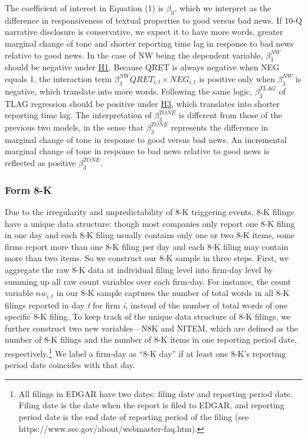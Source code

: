 \documentclass[letterpaper,12pt]{article}
\begin{document}
\begin{spacing}{1.5}
The coefficient of interest in Equation (1) is $\beta_3$, which we interpret as the difference in responsiveness of textual properties to good versus bad news. If 10-Q narrative disclosure is conservative, we expect it to have more words, greater marginal change of tone and shorter reporting time lag in response to bad news relative to good news. In the case of NW being the dependent variable, $\beta_3^{NW}$ should be negative under \hyperref[h1]{H1}. Because QRET is always negative when NEG equals 1, the interaction term $\beta_3^{NW}QRET_{i,t}\times NEG_{i,t}$ is positive only when $\beta_3^{NW}$ is negative, which translate into more words. Following the same logic, $\beta_3^{TLAG}$ of TLAG regression should be positive under \hyperref[h3]{H3}, which translates into shorter reporting time lag. The interpretation of $\beta_3^{TONE}$ is different from those of the previous two models, in the sense that $\beta_3^{TONE}$ represents the difference in marginal change of tone in response to good versus bad news. An incremental marginal change of tone in response to bad news relative to good news is reflected as positive $\beta_3^{TONE}$.

\subsubsection{Form 8-K} \label{sec3.3.2}
\noindent Due to the irregularity and unpredictability of 8-K triggering events, 8-K filings have a unique data structure: though most companies only report one 8-K filing in one day and each 8-K filing usually contains only one or two 8-K items, some firms report more than one 8-K filing per day and each 8-K filing may contain more than two items. So we construct our 8-K sample in three steps. First, we aggregate the raw 8-K data at individual filing level into firm-day level by summing up all raw count variables over each firm-day. For instance, the count variable $nw_{i,t}$ in our 8-K sample captures the number of total words in all 8-K filings reported in day \textit{t} for firm \textit{i}, instead of the number of total words of one specific 8-K filing. To keep track of the unique data structure of 8-K filings, we further construct two new variables---N8K and NITEM, which are defined as the number of 8-K filings and the number of 8-K items in one reporting period date, respectively.\footnote{All filings in EDGAR have two dates: filing date and reporting period date. Filing date is the date when the report is filed to EDGAR, and reporting period date is the end date of reporting period of the filing (see https://www.sec.gov/about/webmaster-faq.htm).} We label a firm-day as ``8-K day” if at least one 8-K's reporting period date coincides with that day.


\end{spacing}
\end{document}
